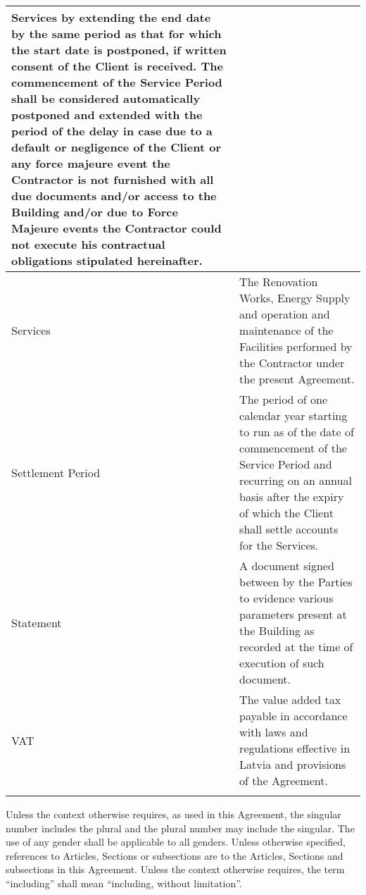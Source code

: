 \begin{center}
\begin{longtabu}{|X|X[3]|}
			 Services by extending the end date by the same period as that for which the
			 start date is postponed, if written consent of the Client is received. The
			 commencement of the Service Period shall be considered automatically postponed
			 and extended with the period of the delay in case due to a default or
			 negligence of the Client or any force majeure event the Contractor is not
			 furnished with all due documents and/or access to the Building and/or due to
			 Force Majeure events the Contractor could not execute his contractual
			 obligations stipulated hereinafter. \\ \hline{}
	Services & The Renovation Works, Energy Supply and operation and
		   maintenance of the Facilities performed by the Contractor under the
	           present Agreement. \\ \hline{}
	Settlement Period & The period of one calendar year starting to run as
			    of the date of commencement of the Service Period and recurring on an annual
			    basis after the expiry of which the Client shall settle accounts for the Services. \\ \hline{}
	Statement & A document signed between by the Parties to evidence
		    various parameters present at the Building as recorded at the time of
		    execution of such document. \\ \hline{}
	VAT & The value added tax payable in accordance with laws and regulations effective in Latvia and provisions of the Agreement. \\ \hline{}
\end{longtabu}
\end{center}

Unless the context otherwise requires, as used in this Agreement, the singular
number includes the plural and the plural number may include the singular. The
use of any gender shall be applicable to all genders. Unless otherwise
specified, references to Articles, Sections or subsections are to the Articles,
Sections and subsections in this Agreement. Unless the context otherwise
requires, the term “including” shall mean “including, without limitation”.

